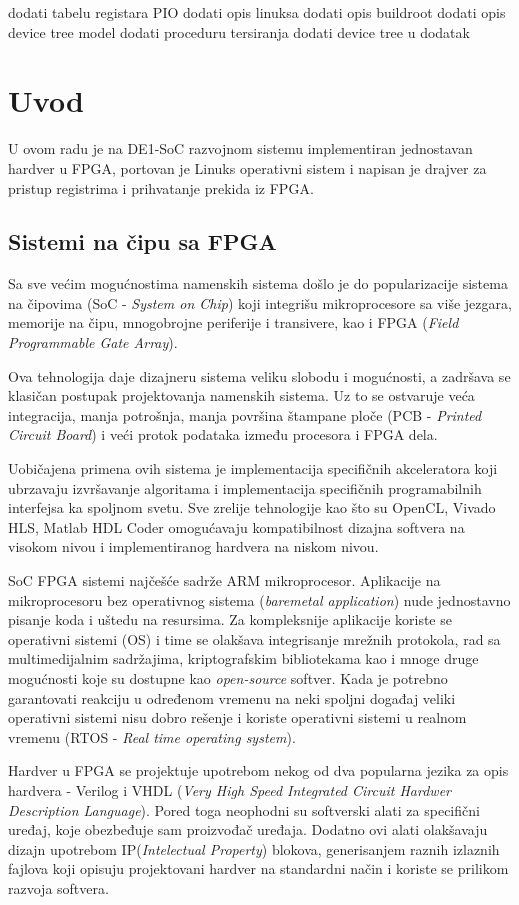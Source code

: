 dodati tabelu registara PIO
dodati opis linuksa
dodati opis buildroot
dodati opis device tree model
dodati proceduru tersiranja
dodati device tree u dodatak

\section{Uvod}
U ovom radu je na DE1-SoC razvojnom sistemu implementiran jednostavan hardver u FPGA, portovan je Linuks operativni sistem i napisan je drajver za pristup registrima i prihvatanje prekida iz FPGA. 

\subsection{Sistemi na čipu sa FPGA}
Sa sve većim mogućnostima namenskih sistema došlo je do popularizacije sistema na čipovima (SoC - \textit{System on Chip}) koji integrišu mikroprocesore sa više jezgara, memorije na čipu, mnogobrojne periferije i transivere, kao i FPGA (\textit{Field Programmable Gate Array}).

Ova tehnologija daje dizajneru sistema veliku slobodu i mogućnosti, a zadršava se klasičan postupak projektovanja namenskih sistema. Uz to se ostvaruje veća integracija, manja potrošnja, manja površina štampane ploče (PCB - \textit{Printed Circuit Board}) i veći protok podataka između procesora i FPGA dela. 

Uobičajena primena ovih sistema je implementacija specifičnih akceleratora koji ubrzavaju izvršavanje algoritama i implementacija specifičnih programabilnih interfejsa ka spoljnom svetu. Sve zrelije tehnologije kao što su OpenCL, Vivado HLS, Matlab HDL Coder omogućavaju kompatibilnost dizajna softvera na visokom nivou i implementiranog hardvera na niskom nivou.

SoC FPGA sistemi najčešće sadrže ARM mikroprocesor. Aplikacije na mikroprocesoru bez operativnog sistema (\textit{baremetal application}) nude jednostavno pisanje koda i uštedu na resursima. Za kompleksnije aplikacije koriste se operativni sistemi (OS) i time se olakšava integrisanje mrežnih protokola, rad sa multimedijalnim sadržajima, kriptografskim bibliotekama kao i mnoge druge mogućnosti koje su dostupne kao \textit{open-source} softver. Kada je potrebno garantovati reakciju u određenom vremenu na neki spoljni događaj veliki operativni sistemi nisu dobro rešenje i koriste operativni sistemi u realnom vremenu (RTOS - \textit{Real time operating system}).

Hardver u FPGA se projektuje upotrebom nekog od dva popularna jezika za opis hardvera - Verilog i VHDL (\textit{Very High Speed Integrated Circuit Hardwer Description Language}). Pored toga neophodni su softverski alati za specifični uređaj, koje obezbeđuje sam proizvođač uređaja. Dodatno ovi alati olakšavaju dizajn upotrebom IP(\textit{Intelectual Property}) blokova, generisanjem raznih izlaznih fajlova koji opisuju projektovani hardver na standardni način i koriste se prilikom razvoja softvera.

